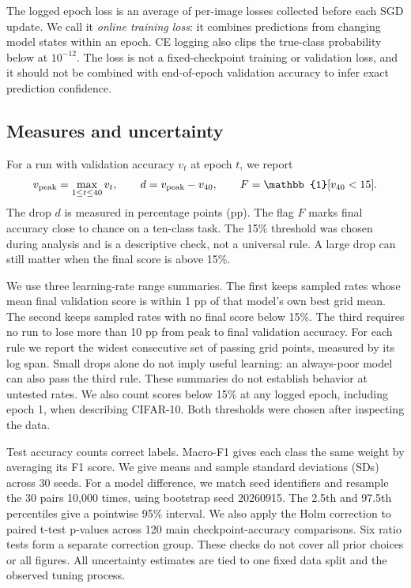 \documentclass[10pt]{article}
\begin{document}
The logged epoch loss is an average of per-image losses collected before each SGD update. We call it \emph{online training loss}: it combines predictions from changing model states within an epoch. CE logging also clips the true-class probability below at $10^{-12}$. The loss is not a fixed-checkpoint training or validation loss, and it should not be combined with end-of-epoch validation accuracy to infer exact prediction confidence.

\subsection{Measures and uncertainty}
For a run with validation accuracy $v_t$ at epoch $t$, we report
\begin{equation}
v_{\rm peak}=\max_{1\leq t\leq40}v_t,\qquad
d=v_{\rm peak}-v_{40},\qquad
F=\mathbb{1}[v_{40}<15].
\label{eq:failure}
\end{equation}
The drop $d$ is measured in percentage points (pp). The flag $F$ marks final accuracy close to chance on a ten-class task. The 15\% threshold was chosen during analysis and is a descriptive check, not a universal rule. A large drop can still matter when the final score is above 15\%.

We use three learning-rate range summaries. The first keeps sampled rates whose mean final validation score is within 1 pp of that model's own best grid mean. The second keeps sampled rates with no final score below 15\%. The third requires no run to lose more than 10 pp from peak to final validation accuracy. For each rule we report the widest consecutive set of passing grid points, measured by its log span. Small drops alone do not imply useful learning: an always-poor model can also pass the third rule. These summaries do not establish behavior at untested rates. We also count scores below 15\% at any logged epoch, including epoch 1, when describing CIFAR-10. Both thresholds were chosen after inspecting the data.

Test accuracy counts correct labels. Macro-F1 gives each class the same weight by averaging its F1 score. We give means and sample standard deviations (SDs) across 30 seeds. For a model difference, we match seed identifiers and resample the 30 pairs 10,000 times, using bootstrap seed 20260915. The 2.5th and 97.5th percentiles give a pointwise 95\% interval. We also apply the Holm correction to paired t-test p-values across 120 main checkpoint-accuracy comparisons. Six ratio tests form a separate correction group. These checks do not cover all prior choices or all figures. All uncertainty estimates are tied to one fixed data split and the observed tuning process.
\end{document}
